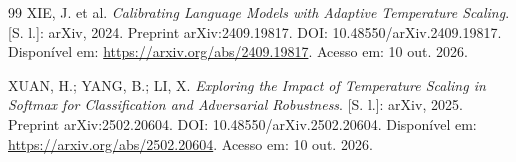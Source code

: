 \begin{thebibliography}{99}
 XIE, J. et al. \textit{Calibrating Language Models with Adaptive Temperature Scaling}. [S. l.]: arXiv, 2024. Preprint arXiv:2409.19817. DOI: 10.48550/arXiv.2409.19817. Disponível em: \url{https://arxiv.org/abs/2409.19817}. Acesso em: 10 out. 2026.

 XUAN, H.; YANG, B.; LI, X. \textit{Exploring the Impact of Temperature Scaling in Softmax for Classification and Adversarial Robustness}. [S. l.]: arXiv, 2025. Preprint arXiv:2502.20604. DOI: 10.48550/arXiv.2502.20604. Disponível em: \url{https://arxiv.org/abs/2502.20604}. Acesso em: 10 out. 2026.

\end{thebibliography}
